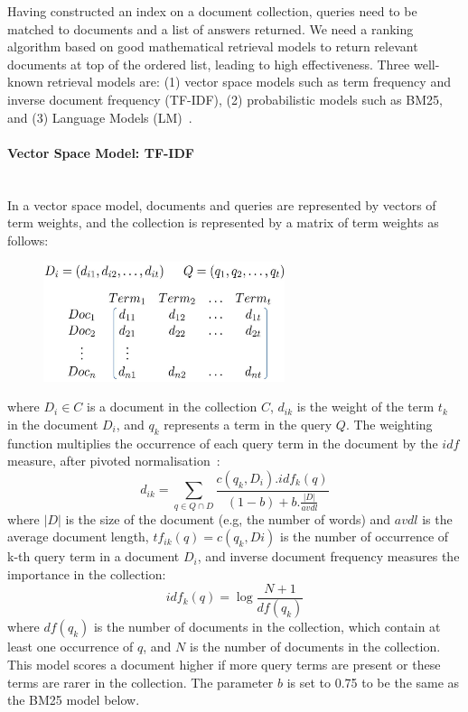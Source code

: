 Having constructed an index on a document collection, queries need to 
be matched to documents and a list of answers returned. We need a ranking algorithm based on good mathematical retrieval models to 
return relevant documents at top of the ordered list, leading to high effectiveness. 
Three well-known retrieval models are: (1) vector space models such as term frequency and inverse document frequency (TF-IDF), (2) probabilistic models such as BM25, and (3) Language Models (LM)~\citep{croft2010search}. 

\paragraph{Vector Space Model: TF-IDF}
\ \\
In a vector space model, documents and queries are represented by vectors of term weights, and the collection is represented by a matrix of term weights as follows: 
\capstartfalse
\begin{figure}[htpb]
   \centering
   \includegraphics[width=.45\textwidth,height=35mm]{figs/vsm-matrix.jpg}
\end{figure}
\capstarttrue
\FloatBarrier 
\noindent
where $ D_{i}\in C $ is a document in the collection $ C $, $ d_{ik} $ is the weight of the term $ t_{k} $ in the document $ D_{i} $, and $ q_{k} $ represents a term in the query $ Q $.
The weighting function multiplies the occurrence of each query term in the document
by the $ idf $ measure, after pivoted normalisation~\citep{bache2010improving}:
\begin{equation}
d_{ik}=\sum\limits_{q \in Q\cap D}\frac{c(q_{k},D_{i}).idf_{k}(q)}{(1-b)+b.\frac{|D|}{avdl}}
\label{eq:tfidf}
\end{equation}
where $ |D| $ is the size of the document (e.g, the number of words) and $ avdl $ is the average document length, $ tf_{ik}(q)=c(q_{k},Di)$ is the number of occurrence of k-th query term in a document $ D_{i} $, and inverse document frequency measures the importance in the collection: 
\begin{equation}
idf_{k}(q)=\log\frac{N+1}{df(q_{k})}
\label{eq:idf}
\end{equation}
where $ df(q_{k}) $ is the number of documents in the collection, which contain at least one occurrence of $ q $, and $ N $ is the number of documents in the collection. 
This model scores a document higher if more query terms are present or these terms are rarer in the collection. The parameter $ b $ is set to 0.75 to be the same as the BM25 model below.

